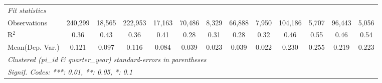 \begin{tabular}{lcccccccccccc}
   \midrule
   \emph{Fit statistics}\\
   Observations                                               & 240,299       & 18,565         & 222,953       & 17,163         & 70,486        & 8,329          & 66,888        & 7,950          & 104,186        & 5,707          & 96,443        & 5,056\\  
   R$^2$                                                      & 0.36          & 0.43           & 0.36          & 0.41           & 0.28          & 0.31           & 0.28          & 0.32           & 0.46           & 0.55           & 0.46          & 0.54\\  
Mean(Dep. Var.) & 0.121 & 0.097 & 0.116 & 0.084 & 0.039 & 0.023 & 0.039 & 0.022 & 0.230 & 0.255 & 0.219 & 0.223 \\
   \midrule \midrule
   \multicolumn{13}{l}{\emph{Clustered (pi\_id \& quarter\_year) standard-errors in parentheses}}\\
   \multicolumn{13}{l}{\emph{Signif. Codes: ***: 0.01, **: 0.05, *: 0.1}}\\
\end{tabular}
\par\endgroup
